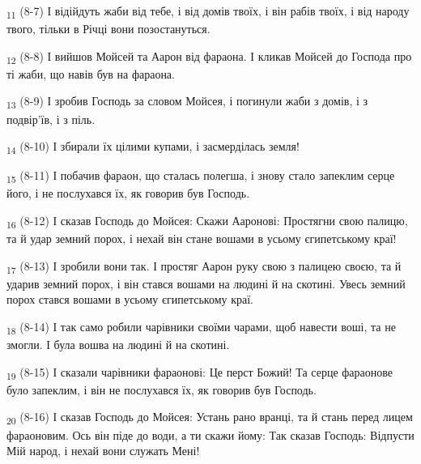 \begin{tcolorbox}
\textsubscript{11} (8-7) І відійдуть жаби від тебе, і від домів твоїх, і він рабів твоїх, і від народу твого, тільки в Річці вони позостануться.
\end{tcolorbox}
\begin{tcolorbox}
\textsubscript{12} (8-8) І вийшов Мойсей та Аарон від фараона. І кликав Мойсей до Господа про ті жаби, що навів був на фараона.
\end{tcolorbox}
\begin{tcolorbox}
\textsubscript{13} (8-9) І зробив Господь за словом Мойсея, і погинули жаби з домів, і з подвір'їв, і з піль.
\end{tcolorbox}
\begin{tcolorbox}
\textsubscript{14} (8-10) І збирали їх цілими купами, і засмерділась земля!
\end{tcolorbox}
\begin{tcolorbox}
\textsubscript{15} (8-11) І побачив фараон, що сталась полегша, і знову стало запеклим серце його, і не послухався їх, як говорив був Господь.
\end{tcolorbox}
\begin{tcolorbox}
\textsubscript{16} (8-12) І сказав Господь до Мойсея: Скажи Ааронові: Простягни свою палицю, та й удар земний порох, і нехай він стане вошами в усьому єгипетському краї!
\end{tcolorbox}
\begin{tcolorbox}
\textsubscript{17} (8-13) І зробили вони так. І простяг Аарон руку свою з палицею своєю, та й ударив земний порох, і він стався вошами на людині й на скотині. Увесь земний порох стався вошами в усьому єгипетському краї.
\end{tcolorbox}
\begin{tcolorbox}
\textsubscript{18} (8-14) І так само робили чарівники своїми чарами, щоб навести воші, та не змогли. І була вошва на людині й на скотині.
\end{tcolorbox}
\begin{tcolorbox}
\textsubscript{19} (8-15) І сказали чарівники фараонові: Це перст Божий! Та серце фараонове було запеклим, і він не послухався їх, як говорив був Господь.
\end{tcolorbox}
\begin{tcolorbox}
\textsubscript{20} (8-16) І сказав Господь до Мойсея: Устань рано вранці, та й стань перед лицем фараоновим. Ось він піде до води, а ти скажи йому: Так сказав Господь: Відпусти Мій народ, і нехай вони служать Мені!
\end{tcolorbox}

